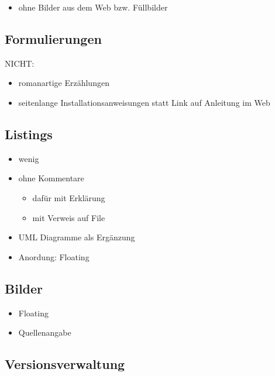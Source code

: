 \begin{itemize}
\tightlist
\item
  ohne Bilder aus dem Web bzw. Füllbilder
\end{itemize}

\hypertarget{formulierungen}{%
\subsection{Formulierungen}\label{formulierungen}}

NICHT:

\begin{itemize}
\tightlist
\item
  romanartige Erzählungen
\item
  seitenlange Installationsanweisungen statt Link auf Anleitung im Web
\end{itemize}

\hypertarget{listings-1}{%
\subsection{Listings}\label{listings-1}}

\begin{itemize}
\item
  wenig
\item
  ohne Kommentare

  \begin{itemize}
  \tightlist
  \item
    dafür mit Erklärung
  \item
    mit Verweis auf File
  \end{itemize}
\item
  UML Diagramme als Ergänzung
\item
  Anordung: Floating
\end{itemize}

\hypertarget{bilder}{%
\subsection{Bilder}\label{bilder}}

\begin{itemize}
\tightlist
\item
  Floating
\item
  Quellenangabe
\end{itemize}

\hypertarget{versionsverwaltung}{%
\subsection{Versionsverwaltung}\label{versionsverwaltung}}

